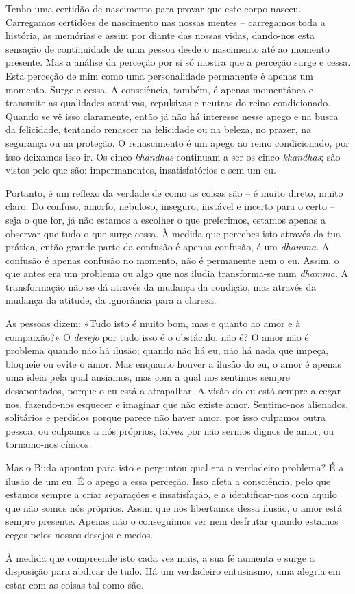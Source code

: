 Tenho uma certidão de nascimento para provar que este corpo nasceu. Carregamos
certidões de nascimento nas nossas mentes -- carregamos toda a história, as
memórias e assim por diante das nossas vidas, dando-nos esta sensação de
continuidade de uma pessoa desde o nascimento até ao momento presente. Mas a
análise da perceção por si só mostra que a perceção surge e cessa. Esta perceção
de mim como uma personalidade permanente é apenas um momento. Surge e cessa. A
consciência, também, é apenas momentânea e transmite as qualidades atrativas,
repulsivas e neutras do reino condicionado. Quando se vê isso claramente, então
já não há interesse nesse apego e na busca da felicidade, tentando renascer na
felicidade ou na beleza, no prazer, na segurança ou na proteção. O renascimento
é um apego ao reino condicionado, por isso deixamos isso ir. Os cinco
\emph{khandhas} continuam a ser os cinco \emph{khandhas}; são vistos pelo que
são: impermanentes, insatisfatórios e sem um eu.

Portanto, é um reflexo da verdade de como as coisas são -- é muito direto, muito
claro. Do confuso, amorfo, nebuloso, inseguro, instável e incerto para o certo
-- seja o que for, já não estamos a escolher o que preferimos, estamos apenas a
observar que tudo o que surge cessa. À medida que percebes isto através da tua
prática, então grande parte da confusão é apenas confusão, é um \emph{dhamma}. A
confusão é apenas confusão no momento, não é permanente nem o eu. Assim, o que
antes era um problema ou algo que nos iludia transforma-se num \emph{dhamma}. A
transformação não se dá através da mudança da condição, mas através da mudança
da atitude, da ignorância para a clareza.

As pessoas dizem: «Tudo isto é muito bom, mas e quanto ao amor e à compaixão?» O
\emph{desejo} por tudo isso é o obstáculo, não é? O amor não é problema quando
não há ilusão; quando não há eu, não há nada que impeça, bloqueie ou evite o
amor. Mas enquanto houver a ilusão do eu, o amor é apenas uma ideia pela qual
ansiamos, mas com a qual nos sentimos sempre desapontados, porque o eu está a
atrapalhar. A visão do eu está sempre a cegar-nos, fazendo-nos esquecer e
imaginar que não existe amor. Sentimo-nos alienados, solitários e perdidos
porque parece não haver amor, por isso culpamos outra pessoa, ou culpamos a nós
próprios, talvez por não sermos dignos de amor, ou tornamo-nos cínicos.

Mas o Buda apontou para isto e perguntou qual era o verdadeiro problema? É a
ilusão de um eu. É o apego a essa perceção. Isso afeta a consciência, pelo que
estamos sempre a criar separações e insatisfação, e a identificar-nos com
aquilo que não somos nós próprios. Assim que nos libertamos dessa ilusão, o amor
está sempre presente. Apenas não o conseguimos ver nem desfrutar quando estamos
cegos pelos nossos desejos e medos.

À medida que compreende isto cada vez mais, a sua fé aumenta e surge a
disposição para abdicar de tudo. Há um verdadeiro entusiasmo, uma alegria em
estar com as coisas tal como são.
